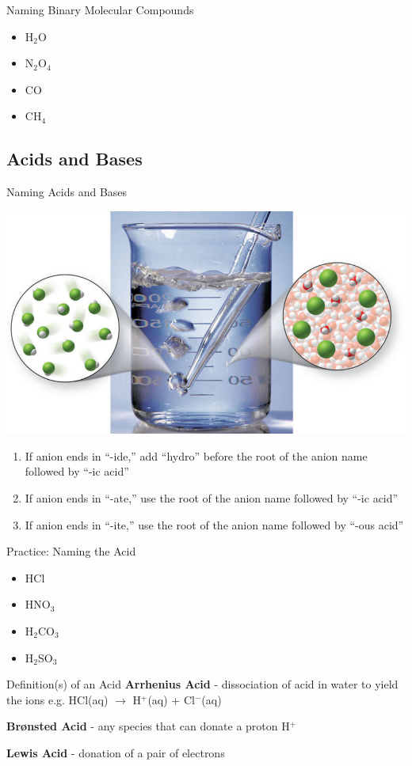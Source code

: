 \documentclass[11pt]{beamer}
\begin{document}
\begin{frame}{Naming Binary Molecular Compounds}
  \begin{itemize}
  \item H$_2$O
  \item N$_2$O$_4$
  \item CO
  \item CH$_4$
  \end{itemize}
\end{frame}

\subsection{Acids and Bases}

\begin{frame}{Naming Acids and Bases}
  \begin{center}
    \includegraphics[width=0.5\linewidth]{acid_base}
  \end{center}

  \begin{enumerate}
  \item If anion ends in ``-ide,'' add ``hydro'' before the
    root of the anion name followed by ``-ic acid''
  \item If anion ends in ``-ate,'' use the root of the anion
    name followed by ``-ic acid''
  \item If anion ends in ``-ite,'' use the root of the anion
    name followed by ``-ous acid''
  \end{enumerate}
\end{frame}

\begin{frame}{Practice: Naming the Acid}
  \begin{itemize}
  \item HCl
  \item HNO$_3$
  \item H$_2$CO$_3$
  \item H$_2$SO$_3$
  \end{itemize}
\end{frame}

\begin{frame}{Definition(s) of an Acid}
  \textbf{Arrhenius Acid} - dissociation of acid in water to yield
  the ions e.g. HCl(aq) $\rightarrow$ H$^+$(aq) + Cl$^-$(aq)
  
  \textbf{Br{\o}nsted Acid} - any species that can donate a proton
  H$^+$

  \textbf{Lewis Acid} - donation of a pair of electrons
\end{frame}
\end{document}
